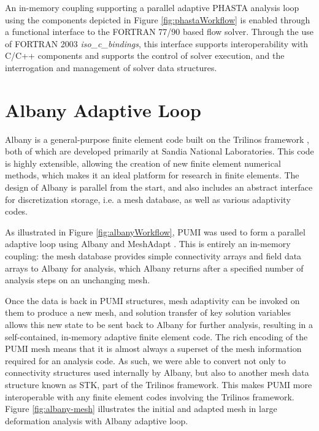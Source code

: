 An in-memory coupling supporting a parallel adaptive PHASTA analysis
loop \cite{smith2016building} using the components depicted in
Figure \ref{fig:phastaWorkflow} is enabled through a functional interface to the
FORTRAN 77/90 based flow solver. Through the use of FORTRAN 2003
\emph{iso\_c\_bindings}, this interface supports interoperability with C/C++
components and supports the control of solver execution, and the interrogation
and management of solver data structures.

\section{Albany Adaptive Loop}

Albany is a general-purpose finite element code built on the
Trilinos framework \cite{TrilinosOverview,trilinosweb}, both of which are developed
primarily at Sandia National Laboratories. This code is highly extensible,
allowing the creation of new finite element numerical methods, which makes it an
ideal platform for research in finite elements. The design of Albany is parallel
from the start, and also includes an abstract interface for discretization
storage, i.e. a mesh database, as well as various adaptivity codes.

As illustrated in Figure \ref{fig:albanyWorkflow}, PUMI was used to form a
parallel adaptive loop using Albany and MeshAdapt \cite{smith2016building,meshadaptweb}.
This is entirely an in-memory coupling: the mesh database provides simple
connectivity arrays and field data arrays to Albany for analysis, which Albany
returns after a specified number of analysis steps on an unchanging mesh.

Once the data is back in PUMI structures, mesh adaptivity can be invoked on them
to produce a new mesh, and solution transfer of key solution variables allows
this new state to be sent back to Albany for further analysis,
resulting in a self-contained, in-memory adaptive finite element code. The rich
encoding of the PUMI mesh means that it is almost always a superset of the mesh
information required for an analysis code. As such, we were able to convert not
only to connectivity structures used internally by Albany, but also to another
mesh data structure known as STK, part of the Trilinos framework. This makes
PUMI more interoperable with any finite element codes involving the Trilinos
framework. Figure \ref{fig:albany-mesh} illustrates the initial and adapted mesh
in large deformation analysis with Albany adaptive loop.

